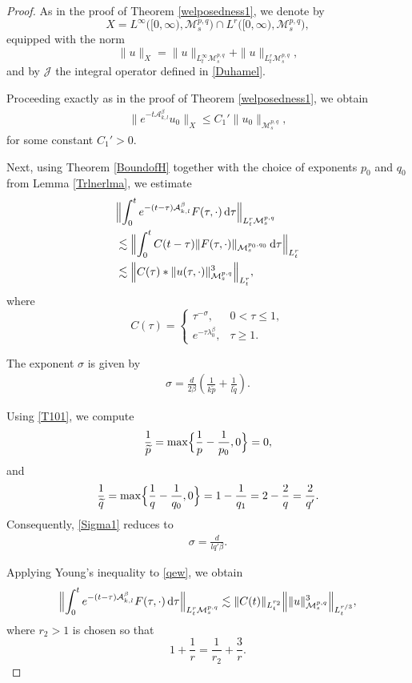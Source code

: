 \documentclass[12pt,reqno,a4paper]{amsart}
\numberwithin{equation}{section}
\theoremstyle{plain}
\theoremstyle{definition}
\theoremstyle{remark}
\def\M{\mathcal{M}}
\def \Ad{\mathcal{A}_{k,l}}
\def \M{{\mathcal M}}
\begin{document}
\begin{proof}
As in the proof of Theorem \ref{welposedness1}, we denote by
\[
X
=
L^{\infty}\bigl([0,\infty),\M^{p,q}_{s}\bigr)
\cap
L^{r}\bigl([0,\infty),\M^{p,q}_{s}\bigr),
\]
equipped with the norm
\[
\|u\|_{X}
=
\|u\|_{L^{\infty}_{t}\M^{p,q}_{s}}
+
\|u\|_{L^{r}_{t}\M^{p,q}_{s}},
\]
and by $\mathcal{J}$ the integral operator defined in
\eqref{Duhamel}.

Proceeding exactly as in the proof of Theorem
\ref{welposedness1}, we obtain
\begin{align}
\label{awk}
\|e^{-t\Ad^{\beta}}u_{0}\|_{X}
\leq
C_{1}'\|u_{0}\|_{\M^{p,q}_{s}},
\end{align}
for some constant $C_{1}'>0$.

Next, using Theorem \ref{BoundofH} together with the choice of
exponents $p_{0}$ and $q_{0}$ from Lemma \ref{Trlnerlma}, we estimate
\begin{align}
\label{qew}
&
\Bigl\|
\int_{0}^{t}
e^{-(t-\tau)\Ad^{\beta}}
F(\tau,\cdot)\,\mathrm{d}\tau
\Bigr\|_{L^{r}_{t}\M^{p,q}_{s}}
\nonumber\\
&\lesssim
\Bigl\|
\int_{0}^{t}
C(t-\tau)
\|F(\tau,\cdot)\|_{\M^{p_{0},q_{0}}_{s}}
\,\mathrm{d}\tau
\Bigr\|_{L^{r}_{t}}
\nonumber\\
&\lesssim
\Bigl\|
C(\tau)
*
\|u(\tau,\cdot)\|_{\M^{p,q}_{s}}^{3}
\Bigr\|_{L^{r}_{t}},
\end{align}
where
\[
C(\tau)
=
\begin{cases}
\tau^{-\sigma},
& 0<\tau\leq 1,
\\[0.3em]
e^{-\tau\lambda_{0}^{\beta}},
& \tau\geq 1.
\end{cases}
\]

The exponent $\sigma$ is given by
\begin{align}
\label{Sigma1}
\sigma
=
\frac{d}{2\beta}
\left(
\frac{1}{k\widetilde{p}}
+
\frac{1}{l\widetilde{q}}
\right).
\end{align}

Using \eqref{T101}, we compute
\[
\frac{1}{\widetilde{p}}
=
\max\Bigl\{
\frac{1}{p}-\frac{1}{p_{0}},
0
\Bigr\}
=
0,
\]
and
\[
\frac{1}{\widetilde{q}}
=
\max\Bigl\{
\frac{1}{q}-\frac{1}{q_{0}},
0
\Bigr\}
=
1-\frac{1}{q_{1}}
=
2-\frac{2}{q}
=
\frac{2}{q'}.
\]
Consequently, \eqref{Sigma1} reduces to
\begin{align}
\label{sigma2}
\sigma
=
\frac{d}{lq'\beta}.
\end{align}

Applying Young's inequality to \eqref{qew}, we obtain
\begin{align}
\label{qwee}
\Bigl\|
\int_{0}^{t}
e^{-(t-\tau)\Ad^{\beta}}
F(\tau,\cdot)\,\mathrm{d}\tau
\Bigr\|_{L^{r}_{t}\M^{p,q}_{s}}
\lesssim
\|C(t)\|_{L^{r_{2}}_{t}}
\Bigl\|
\|u\|_{\M^{p,q}_{s}}^{3}
\Bigr\|_{L^{r/3}_{t}},
\end{align}
where $r_{2}>1$ is chosen so that
\[
1+\frac{1}{r}
=
\frac{1}{r_{2}}
+
\frac{3}{r}.
\]


\end{proof}
\end{document}

